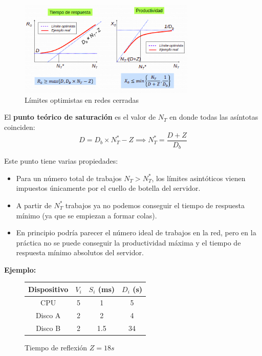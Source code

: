 \documentclass[12pt,spanish]{article}
\begin{document}
\begin{figure}[H]
	\centering
	\includegraphics[width=0.75\textwidth]{optimistascerradas.png}
	\caption{Límites optimistas en redes cerradas}
\end{figure}

El \textbf{punto teórico de saturación} es el valor de $N_T$ en donde todas las asíntotas coinciden:
\begin{equation*}
	D = D_b \times N_T^* - Z \implies N_T^* = \frac{D + Z}{D_b}
\end{equation*}

Este punto tiene varias propiedades:
\begin{itemize}
	\item Para un número total de trabajos $N_T > N_T^*$, los límites asintóticos vienen impuestos únicamente por el cuello de botella del servidor.
	\item A partir de $N_T^*$ trabajos ya no podemos conseguir el tiempo de respuesta mínimo (ya que se empiezan a formar colas).
	\item En principio podría parecer el número ideal de trabajos en la red, pero en la práctica no se puede conseguir la productividad máxima y el tiempo de respuesta mínimo absolutos del servidor.
\end{itemize}

\textbf{Ejemplo:\\}
\begin{figure}[H]
	\centering
	\begin{tabular}{|c|c|c|c|}
		\hline
		Dispositivo & $V_i$ & $S_i$ (ms) & $D_i$ (s)\\
		\hline
		CPU & 5 & 1 & 5\\
		\hline
		Disco A & 2 & 2 & 4 \\
		\hline
		Disco B & 2 & 1.5 & 34 \\
		\hline
	\end{tabular}
	Tiempo de reflexión $Z=18s$
\end{figure}
\end{document}

